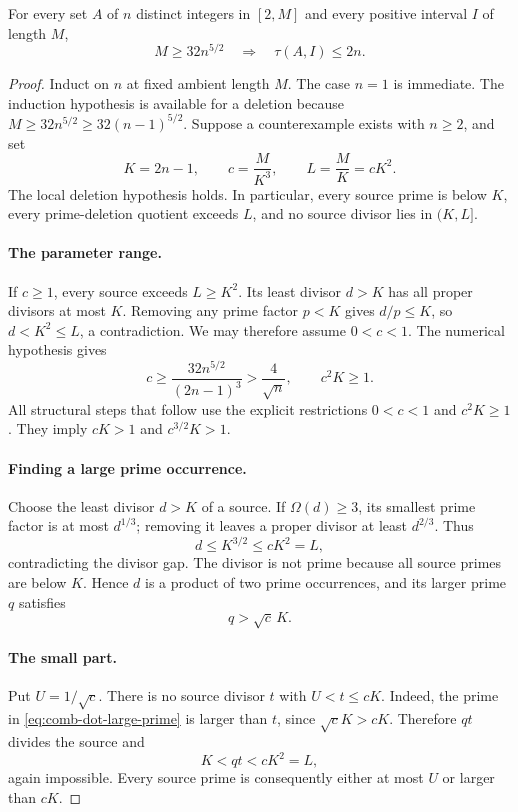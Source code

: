 \begin{theorem}
\label{thm:comb-dot}
For every set $A$ of $n$ distinct integers in $[2,M]$ and every
positive interval $I$ of length $M$,
\[
 M\ge32n^{5/2}\quad\Longrightarrow\quad\tau(A,I)\le2n.
\]
\end{theorem}

\begin{proof}
Induct on $n$ at fixed ambient length $M$. The case $n=1$ is
immediate. The induction hypothesis is available for a deletion
because $M\ge32n^{5/2}\ge32(n-1)^{5/2}$. Suppose a counterexample
exists with $n\ge2$, and set
\[
 K=2n-1,\qquad c=\frac M{K^3},\qquad L=\frac MK=cK^2.
\]
The local deletion hypothesis holds. In particular, every source
prime is below $K$, every prime-deletion quotient exceeds $L$,
and no source divisor lies in $(K,L]$.

\paragraph{The parameter range.}
If $c\ge1$, every source exceeds $L\ge K^2$. Its least divisor
$d>K$ has all proper divisors at most $K$. Removing any prime
factor $p<K$ gives $d/p\le K$, so $d<K^2\le L$, a contradiction.
We may therefore assume $0<c<1$. The numerical hypothesis gives
\begin{equation}
 c\ge\frac{32n^{5/2}}{(2n-1)^3}>\frac4{\sqrt n},
 \qquad c^2K\ge1.
 \label{eq:comb-dot-range}
\end{equation}
All structural steps that follow use the explicit restrictions
$0<c<1$ and $c^2K\ge1$. They imply
$cK>1$ and $c^{3/2}K>1$.

\paragraph{Finding a large prime occurrence.}
Choose the least divisor $d>K$ of a source. If $\Omega(d)\ge3$,
its smallest prime factor is at most $d^{1/3}$; removing it leaves
a proper divisor at least $d^{2/3}$. Thus
\[
 d\le K^{3/2}\le cK^2=L,
\]
contradicting the divisor gap. The divisor is not prime because
all source primes are below $K$. Hence $d$ is a product of two
prime occurrences, and its larger prime $q$ satisfies
\begin{equation}
 q>\sqrt c\,K.
 \label{eq:comb-dot-large-prime}
\end{equation}

\paragraph{The small part.}
Put $U=1/\sqrt c$. There is no source divisor $t$ with
$U<t\le cK$. Indeed, the prime in
\eqref{eq:comb-dot-large-prime} is larger than $t$, since
$\sqrt cK>cK$. Therefore $qt$ divides the source and
\[
 K<qt<cK^2=L,
\]
again impossible. Every source prime is consequently either at
most $U$ or larger than $cK$.


\end{proof}
